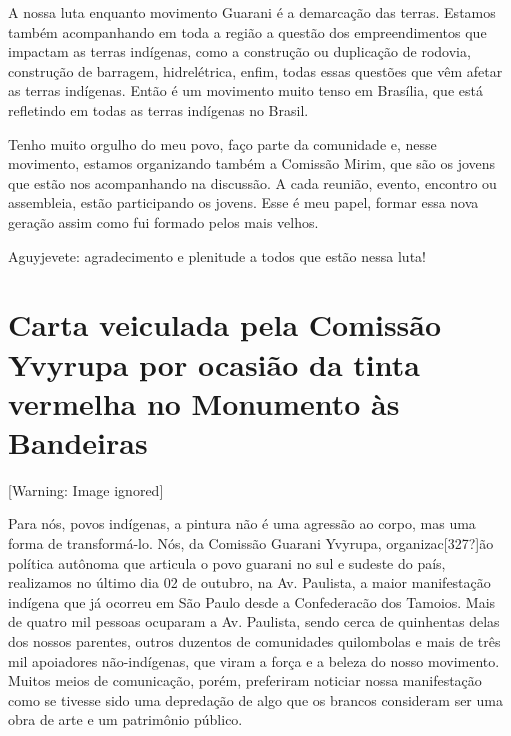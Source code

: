 \documentclass{article}
\begin{document}
A nossa luta enquanto movimento Guarani \'e a demarca\c{c}\~ao das
terras. Estamos tamb\'em acompanhando em toda a regi\~ao a quest\~ao
dos empreendimentos que impactam as terras ind\'igenas, como a
constru\c{c}\~ao ou duplica\c{c}\~ao de rodovia, constru\c{c}\~ao de
barragem, hidrel\'etrica, enfim, todas essas quest\~oes que v\^em
afetar as terras ind\'igenas. Ent\~ao \'e um movimento muito tenso em
Bras\'ilia, que est\'a refletindo em todas as terras ind\'igenas no
Brasil.

Tenho muito orgulho do meu povo, fa\c{c}o parte da comunidade e, nesse
movimento, estamos organizando tamb\'em a Comiss\~ao Mirim, que s\~ao
os jovens que est\~ao nos acompanhando na discuss\~ao. A cada
reuni\~ao, evento, encontro ou assembleia, est\~ao participando os
jovens. Esse \'e meu papel, formar essa nova gera\c{c}\~ao assim como
fui formado pelos mais velhos. 

Aguyjevete: agradecimento e plenitude a todos que est\~ao nessa luta!

\section[Carta veiculada pela Comiss\~ao Yvyrupa por ocasi\~ao da tinta
vermelha no Monumento \`as Bandeiras ]{Carta veiculada pela Comiss\~ao
Yvyrupa por ocasi\~ao da tinta vermelha no Monumento \`as Bandeiras }
  [Warning: Image ignored] %
 

Para n\'os, povos ind\'igenas, a pintura n\~ao \'e uma agress\~ao ao
corpo, mas uma forma de transform\'a-lo. N\'os, da Comiss\~ao Guarani
Yvyrupa, organizac[327?]\~ao pol\'itica aut\^onoma que articula o povo
guarani no sul e sudeste do pa\'is, realizamos no \'ultimo dia 02 de
outubro, na Av. Paulista, a maior manifesta\c{c}\~ao ind\'igena que
j\'{a} ocorreu em S\~ao Paulo desde a Confederac\~ao dos Tamoios. Mais
de quatro mil pessoas ocuparam a Av. Paulista, sendo cerca de
quinhentas delas dos nossos parentes, outros duzentos de comunidades
quilombolas e mais de tr\^es mil apoiadores n\~ao-ind\'igenas, que
viram a for\c{c}a e a beleza do nosso movimento. Muitos meios de
comunica\c{c}\~ao, por\'em, preferiram noticiar nossa
manifesta\c{c}\~ao como se tivesse sido uma depreda\c{c}\~ao de algo
que os brancos consideram ser uma obra de arte e um patrim\^onio
p\'ublico. 
\end{document}
